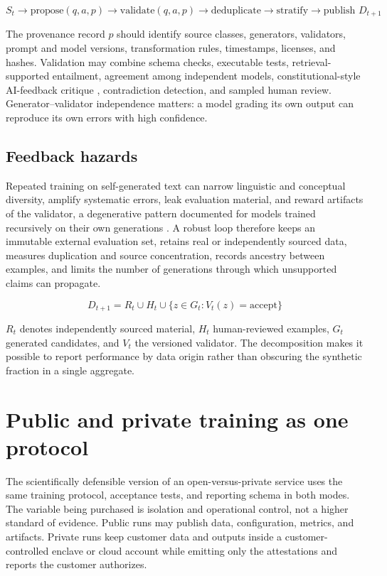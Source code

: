 \documentclass[11pt]{article}
\begin{document}
\[
S_t \to \text{propose}(q,a,p) \to \text{validate}(q,a,p) \to \text{deduplicate} \to \text{stratify} \to \text{publish } D_{t+1}
\]

The provenance record $p$ should identify source classes, generators, validators, prompt and model versions, transformation rules, timestamps, licenses, and hashes. Validation may combine schema checks, executable tests, retrieval-supported entailment, agreement among independent models, constitutional-style AI-feedback critique \cite{bai2022}, contradiction detection, and sampled human review. Generator--validator independence matters: a model grading its own output can reproduce its own errors with high confidence.

\subsection{Feedback hazards}
Repeated training on self-generated text can narrow linguistic and conceptual diversity, amplify systematic errors, leak evaluation material, and reward artifacts of the validator, a degenerative pattern documented for models trained recursively on their own generations \cite{shumailov2024}. A robust loop therefore keeps an immutable external evaluation set, retains real or independently sourced data, measures duplication and source concentration, records ancestry between examples, and limits the number of generations through which unsupported claims can propagate.

\[
D_{t+1} = R_t \cup H_t \cup \{ z \in G_t : V_t(z) = \text{accept} \}
\]

$R_t$ denotes independently sourced material, $H_t$ human-reviewed examples, $G_t$ generated candidates, and $V_t$ the versioned validator. The decomposition makes it possible to report performance by data origin rather than obscuring the synthetic fraction in a single aggregate.

\section{Public and private training as one protocol}
The scientifically defensible version of an open-versus-private service uses the same training protocol, acceptance tests, and reporting schema in both modes. The variable being purchased is isolation and operational control, not a higher standard of evidence. Public runs may publish data, configuration, metrics, and artifacts. Private runs keep customer data and outputs inside a customer-controlled enclave or cloud account while emitting only the attestations and reports the customer authorizes.
\end{document}
